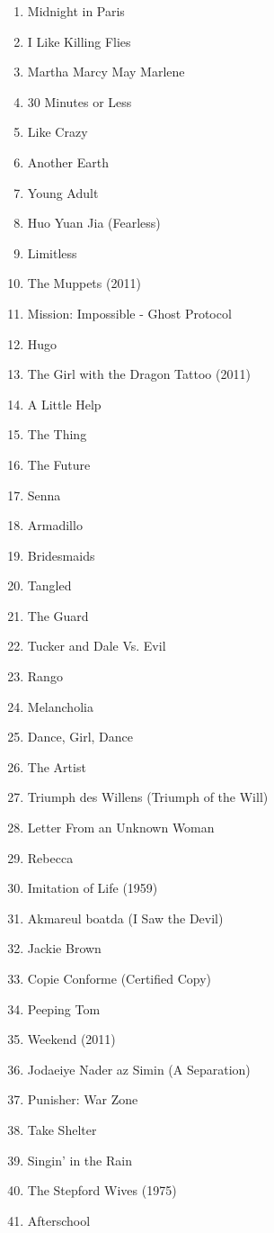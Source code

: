 \documentclass[11pt]{article}
\begin{document}
\begin{enumerate}
\item Midnight in Paris
\item I Like Killing Flies
\item Martha Marcy May Marlene
\item 30 Minutes or Less
\item Like Crazy
\item Another Earth
\item Young Adult
\item Huo Yuan Jia (Fearless)
\item Limitless
\item The Muppets (2011)
\item Mission: Impossible - Ghost Protocol
\item Hugo
\item The Girl with the Dragon Tattoo (2011)
\item A Little Help
\item The Thing
\item The Future
\item Senna
\item Armadillo
\item Bridesmaids
\item Tangled
\item The Guard
\item Tucker and Dale Vs. Evil
\item Rango
\item Melancholia
\item Dance, Girl, Dance
\item The Artist
\item Triumph des Willens (Triumph of the Will)
\item Letter From an Unknown Woman
\item Rebecca
\item Imitation of Life (1959)
\item Akmareul boatda (I Saw the Devil)
\item Jackie Brown
\item Copie Conforme (Certified Copy)
\item Peeping Tom
\item Weekend (2011)
\item Jodaeiye Nader az Simin (A Separation)
\item Punisher: War Zone
\item Take Shelter
\item Singin' in the Rain
\item The Stepford Wives (1975)
\item Afterschool 

\end{enumerate}
\end{document}
